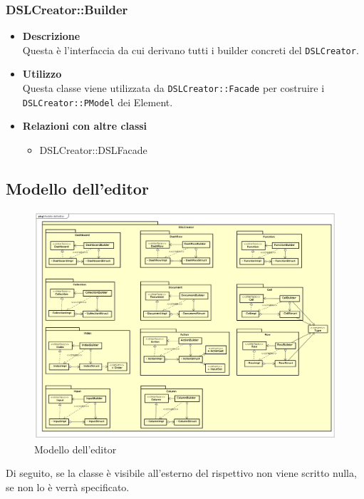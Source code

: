         \subsubsection{DSLCreator::Builder}
        \begin{itemize}
        \item \textbf{Descrizione} \hfill \\
          Questa è l'interfaccia da cui derivano tutti i builder concreti del  \texttt{DSLCreator}.
        \item \textbf{Utilizzo}  \hfill \\
          Questa classe viene utilizzata da \texttt{DSLCreator::Facade} per costruire i \texttt{DSLCreator::PModel} dei  Element.
        \item \textbf{Relazioni con altre classi} \hfill 
          \begin{itemize}
          \item DSLCreator::DSLFacade
          \end{itemize}
        \end{itemize}

        \subsection{Modello dell'editor}
        \begin{figure}[H]
          \centering
          \includegraphics[width=1.1\textwidth]{res/img/Diagram_Model.png}
          \caption{Modello dell'editor}
          \label{fig:diagram_model}
        \end{figure}
        Di seguito, se la classe è visibile all'esterno del rispettivo  non viene scritto nulla, se non lo è verrà specificato.
